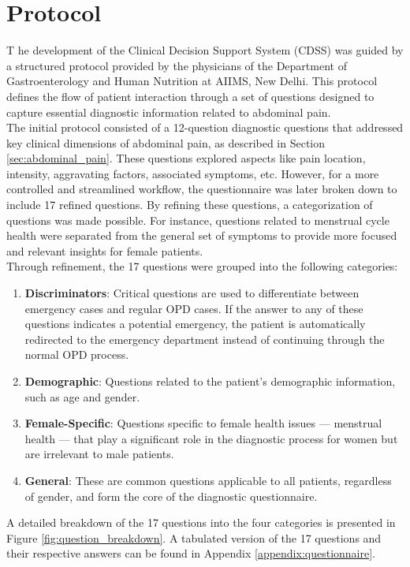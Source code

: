 \section{Protocol}
\lettrine{T}{ }he development of the Clinical Decision Support System (CDSS) was guided by a structured protocol provided by the physicians of the Department of Gastroenterology and Human Nutrition at AIIMS, New Delhi. This protocol defines the flow of patient interaction through a set of questions designed to capture essential diagnostic information related to abdominal pain.\\[\baselineskip]

\noindent The initial protocol consisted of a 12-question diagnostic questions that addressed key clinical dimensions of abdominal pain, as described in Section \ref{sec:abdominal_pain}. These questions explored aspects like pain location, intensity, aggravating factors, associated symptoms, etc. However, for a more controlled and streamlined workflow, the questionnaire was later broken down to include 17 refined questions. By refining these questions, a categorization of questions was made possible. For instance, questions related to menstrual cycle health were separated from the general set of symptoms to provide more focused and relevant insights for female patients.\\[\baselineskip]

\noindent Through refinement, the 17 questions were grouped into the following categories:
\begin{enumerate}
    \item \textcolor{TUMRed}{\textbf{Discriminators}}: Critical questions are used to differentiate between emergency cases and regular OPD cases. If the answer to any of these questions indicates a potential emergency, the patient is automatically redirected to the emergency department instead of continuing through the normal OPD process.
    \item \textcolor{TUMRed}{\textbf{Demographic}}: Questions related to the patient's demographic information, such as age and gender.
    \item \textcolor{TUMRed}{\textbf{Female-Specific}}: Questions specific to female health issues --- menstrual health --- that play a significant role in the diagnostic process for women but are irrelevant to male patients.
    \item \textcolor{TUMRed}{\textbf{General}}: These are common questions applicable to all patients, regardless of gender, and form the core of the diagnostic questionnaire.
\end{enumerate}
A detailed breakdown of the 17 questions into the four categories is presented in Figure \ref{fig:question_breakdown}. A tabulated version of the 17 questions and their respective answers can be found in Appendix \ref{appendix:questionnaire}.

